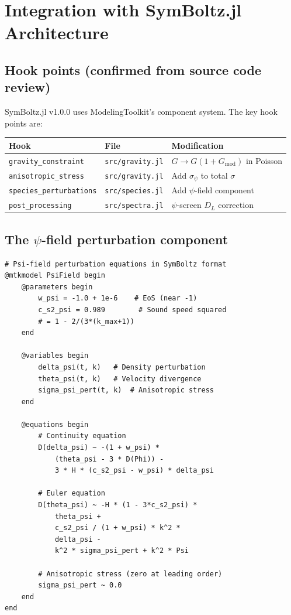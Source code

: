 \documentclass[11pt,a4paper]{article}
\begin{document}
\section{Integration with SymBoltz.jl Architecture}

\subsection{Hook points (confirmed from source code review)}

SymBoltz.jl v1.0.0 uses ModelingToolkit's component system. The key hook points are:

\begin{center}
\begin{tabular}{lll}
\toprule
\textbf{Hook} & \textbf{File} & \textbf{Modification} \\
\midrule
\texttt{gravity\_constraint} & \texttt{src/gravity.jl} & $G \to G(1 + G_{\mathrm{mod}})$ in Poisson \\
\texttt{anisotropic\_stress} & \texttt{src/gravity.jl} & Add $\sigma_\psi$ to total $\sigma$ \\
\texttt{species\_perturbations} & \texttt{src/species.jl} & Add $\psi$-field component \\
\texttt{post\_processing} & \texttt{src/spectra.jl} & $\psi$-screen $D_L$ correction \\
\bottomrule
\end{tabular}
\end{center}

\subsection{The $\psi$-field perturbation component}

\begin{lstlisting}[caption={$\psi$-field perturbation evolution}]
# Psi-field perturbation equations in SymBoltz format
@mtkmodel PsiField begin
    @parameters begin
        w_psi = -1.0 + 1e-6    # EoS (near -1)
        c_s2_psi = 0.989        # Sound speed squared
        # = 1 - 2/(3*(k_max+1))
    end

    @variables begin
        delta_psi(t, k)   # Density perturbation
        theta_psi(t, k)   # Velocity divergence
        sigma_psi_pert(t, k)  # Anisotropic stress
    end

    @equations begin
        # Continuity equation
        D(delta_psi) ~ -(1 + w_psi) *
            (theta_psi - 3 * D(Phi)) -
            3 * H * (c_s2_psi - w_psi) * delta_psi

        # Euler equation
        D(theta_psi) ~ -H * (1 - 3*c_s2_psi) *
            theta_psi +
            c_s2_psi / (1 + w_psi) * k^2 *
            delta_psi -
            k^2 * sigma_psi_pert + k^2 * Psi

        # Anisotropic stress (zero at leading order)
        sigma_psi_pert ~ 0.0
    end
end
\end{lstlisting}
\end{document}
